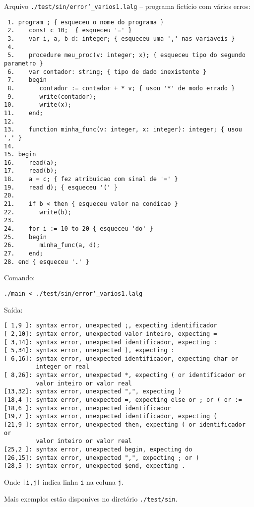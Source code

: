 Arquivo \texttt{./test/sin/error\char`_varios1.lalg} -- programa fictício com vários erros:
\begin{verbatim} 1. program ; { esqueceu o nome do programa }
 2.    const c 10;  { esqueceu '=' }
 3.    var i, a, b d: integer; { esqueceu uma ',' nas variaveis }
 4. 
 5.    procedure meu_proc(v: integer; x); { esqueceu tipo do segundo parametro }
 6.    var contador: string; { tipo de dado inexistente }
 7.    begin
 8.       contador := contador + * v; { usou '*' de modo errado }
 9.       write(contador);
10.       write(x);
11.    end;
12. 
13.    function minha_func(v: integer, x: integer): integer; { usou ',' }
14. 
15. begin
16.    read(a);
17.    read(b);
18.    a = c; { fez atribuicao com sinal de '=' }
19.    read d); { esqueceu '(' }
20. 
21.    if b < then { esqueceu valor na condicao }
22.       write(b);
23. 
24.    for i := 10 to 20 { esqueceu 'do' }
25.    begin
26.       minha_func(a, d);
27.    end;
28. end { esqueceu '.' }\end{verbatim}

Comando:

	\indent\indent\texttt{./main < ./test/sin/error\char`_varios1.lalg}

Saída:
\begin{verbatim}[ 1,9 ]: syntax error, unexpected ;, expecting identificador
[ 2,10]: syntax error, unexpected valor inteiro, expecting =
[ 3,14]: syntax error, unexpected identificador, expecting :
[ 5,34]: syntax error, unexpected ), expecting :
[ 6,16]: syntax error, unexpected identificador, expecting char or
         integer or real
[ 8,26]: syntax error, unexpected *, expecting ( or identificador or
         valor inteiro or valor real
[13,32]: syntax error, unexpected ",", expecting )
[18,4 ]: syntax error, unexpected =, expecting else or ; or ( or :=
[18,6 ]: syntax error, unexpected identificador
[19,7 ]: syntax error, unexpected identificador, expecting (
[21,9 ]: syntax error, unexpected then, expecting ( or identificador or
         valor inteiro or valor real
[25,2 ]: syntax error, unexpected begin, expecting do
[26,15]: syntax error, unexpected ",", expecting ; or )
[28,5 ]: syntax error, unexpected $end, expecting .\end{verbatim}

Onde \texttt{[i,j]} indica linha \texttt{i} na coluna {\texttt{j}}.

Mais exemplos estão disponíves no diretório \texttt{./test/sin}.
